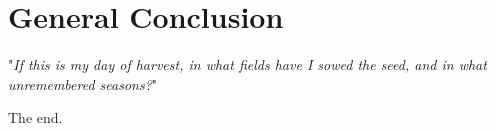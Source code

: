 \clearpage{\pagestyle{empty}\cleardoublepage}		%
\chapter{General Conclusion}
\label{chap:conclusion}

"\textit{If this is my day of harvest, in what fields have I sowed the seed, and in what unremembered seasons?}" \\
\vspace{1cm}

\noindent
The end.